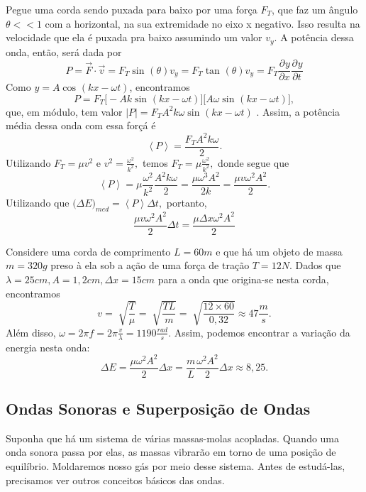 \documentclass[physicsII_notes.tex]{subfiles}
\begin{document}
\begin{example}
	Pegue uma corda sendo puxada para baixo por uma força \(F_{T}\), que faz um ângulo \(\theta << 1\) com a horizontal, na sua extremidade no eixo x negativo. Isso resulta
	na velocidade que ela é puxada pra baixo assumindo um valor \(v_{y}\). A potência dessa onda, então, será dada por
	\[
		P = \vec{F}\cdot \vec{v} = F_{T}\sin^{}{(\theta )}v_{y} = F_{T}\tan^{}{(\theta )}v_{y} = F_{T}\frac{\partial^{}y}{\partial x^{}}\frac{\partial^{}y}{\partial t^{}}
	\]
	Como \(y = A\cos^{}{(kx - \omega t)}\), encontramos
	\[
		P = F_{T}\biggl[-Ak\sin^{}{(kx - \omega t)}\biggr]\biggl[A\omega \sin^{}{(kx - \omega t)}\biggr],
	\]
	que, em módulo, tem valor \(|P|=F_{T}A^{2}k\omega \sin^{}{(kx-\omega t)}\) . Assim, a potência média dessa onda com essa forçá é
	\[
		\left< P \right> = \frac{F_{T}A^{2}k\omega }{2}.
	\]
	Utilizando \(F_{T} = \mu v^{2}\) e \(v^{2} = \frac{\omega ^{2}}{k^{2}},\) temos \(F_{T} = \mu \frac{\omega^{2}}{k^{2}},\) donde segue que
	\[
		\left< P \right> = \mu \frac{\omega^{2}}{k^{2}}\frac{A^{2}k\omega }{2} = \frac{\mu\omega^{3}A^{2}}{2k} = \frac{\mu v \omega^{2}A^{2}}{2}.
	\]
	Utilizando que \(\biggl(\Delta E\biggr)_{med} = \left< P \right> \Delta t,\) portanto,
	\[
		\frac{\mu v \omega ^{2}A^{2}}{2}\Delta t = \frac{\mu\Delta x\omega^{2}A^{2}}{2}
	\]
\end{example}
\begin{example}
	Considere uma corda de comprimento \(L = 60m\) e que há um objeto de massa \(m =320g\) preso à ela sob a ação de uma força de tração
	\(T = 12N\). Dados que \(\lambda = 25cm, A = 1,2cm, \Delta x = 15cm\) para a onda que origina-se nesta corda, encontramos
	\[
		v = \sqrt[]{\frac{T}{\mu}} = \sqrt[]{\frac{TL}{m}} = \sqrt[]{\frac{12\times 60}{0,32}}\approx 47\frac{m}{s}.
	\]
	Além disso, \(\omega = 2\pi f = 2\pi \frac{v}{\lambda } = 1190\frac{rad}{s}.\) Assim, podemos encontrar a variação da energia nesta onda:
	\[
		\Delta E = \frac{\mu\omega ^{2}A^{2}}{2}\Delta x = \frac{m}{L}\frac{\omega ^{2}A^{2}}{2}\Delta x\approx 8,25.
	\]
\end{example}
\subsection{Ondas Sonoras e Superposição de Ondas}
Suponha que há um sistema de várias massas-molas acopladas. Quando uma onda sonora passa por elas, as massas vibrarão em torno de uma posição de equilíbrio.
Moldaremos nosso gás por meio desse sistema. Antes de estudá-las, precisamos ver outros conceitos básicos das ondas.
\end{document}
